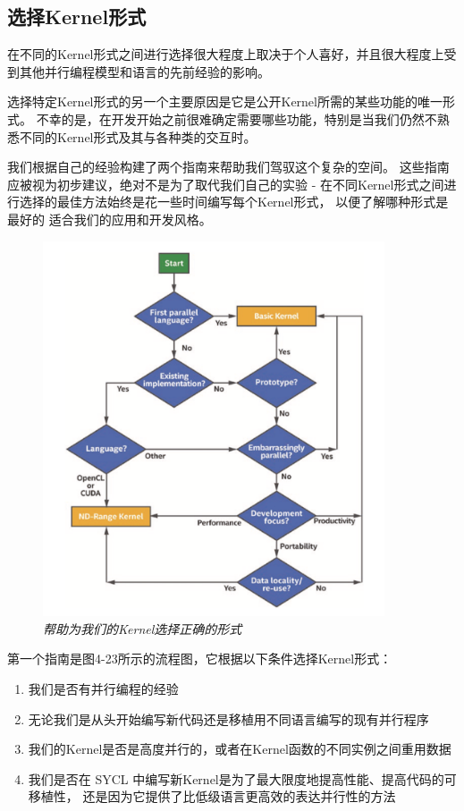 \subsection{选择Kernel形式}
在不同的Kernel形式之间进行选择很大程度上取决于个人喜好，并且很大程度上受到其他并行编程模型和语言的先前经验的影响。

选择特定Kernel形式的另一个主要原因是它是公开Kernel所需的某些功能的唯一形式。 
不幸的是，在开发开始之前很难确定需要哪些功能，特别是当我们仍然不熟悉不同的Kernel形式及其与各种类的交互时。

我们根据自己的经验构建了两个指南来帮助我们驾驭这个复杂的空间。 
这些指南应被视为初步建议，绝对不是为了取代我们自己的实验 - 
在不同Kernel形式之间进行选择的最佳方法始终是花一些时间编写每个Kernel形式，
以便了解哪种形式是最好的 适合我们的应用和开发风格。

\begin{figure}[H]
	\centering
	\includegraphics[width=0.9\textwidth]{figs/F4.23.png}
	\caption{\textit{帮助为我们的Kernel选择正确的形式}}
\end{figure}

第一个指南是图4-23所示的流程图，它根据以下条件选择Kernel形式：

\begin{enumerate}
	\item 我们是否有并行编程的经验

	\item 无论我们是从头开始编写新代码还是移植用不同语言编写的现有并行程序

	\item 我们的Kernel是否是高度并行的，或者在Kernel函数的不同实例之间重用数据

	\item 我们是否在 SYCL 中编写新Kernel是为了最大限度地提高性能、提高代码的可移植性，
	还是因为它提供了比低级语言更高效的表达并行性的方法
\end{enumerate}

